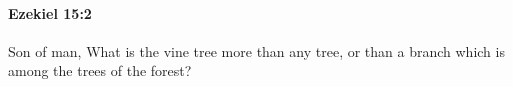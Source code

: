 
		\paragraph{Ezekiel 15:2} %
			\label{EZEKIEL-15-2}

			Son of man, What is the vine tree more than any tree, or than a branch which is among the trees of the forest?


